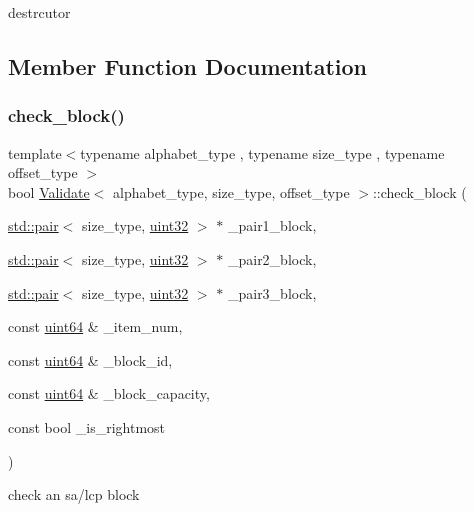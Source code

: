 destrcutor 



\subsection{Member Function Documentation}
\mbox{\label{class_validate_a3d560deb2bd3e2984f6f3b8b8b766904}} 
\subsubsection{\texorpdfstring{check\+\_\+block()}{check\_block()}}
{\footnotesize\ttfamily template$<$typename alphabet\+\_\+type , typename size\+\_\+type , typename offset\+\_\+type $>$ \\
bool \hyperlink{class_validate}{Validate}$<$ alphabet\+\_\+type, size\+\_\+type, offset\+\_\+type $>$\+::check\+\_\+block (\begin{DoxyParamCaption}\item[{\hyperlink{tuples_8h_a80f1b898df1006722612d5ecf89cd4d7}{std\+::pair}$<$ size\+\_\+type, \hyperlink{types_8h_a8f95e75e58492e87412191fabadd8ca8}{uint32} $>$ $\ast$}]{\+\_\+pair1\+\_\+block,  }\item[{\hyperlink{tuples_8h_a80f1b898df1006722612d5ecf89cd4d7}{std\+::pair}$<$ size\+\_\+type, \hyperlink{types_8h_a8f95e75e58492e87412191fabadd8ca8}{uint32} $>$ $\ast$}]{\+\_\+pair2\+\_\+block,  }\item[{\hyperlink{tuples_8h_a80f1b898df1006722612d5ecf89cd4d7}{std\+::pair}$<$ size\+\_\+type, \hyperlink{types_8h_a8f95e75e58492e87412191fabadd8ca8}{uint32} $>$ $\ast$}]{\+\_\+pair3\+\_\+block,  }\item[{const \hyperlink{types_8h_a60e8696a4678cd348e991a1f172e53f7}{uint64} \&}]{\+\_\+item\+\_\+num,  }\item[{const \hyperlink{types_8h_a60e8696a4678cd348e991a1f172e53f7}{uint64} \&}]{\+\_\+block\+\_\+id,  }\item[{const \hyperlink{types_8h_a60e8696a4678cd348e991a1f172e53f7}{uint64} \&}]{\+\_\+block\+\_\+capacity,  }\item[{const bool}]{\+\_\+is\+\_\+rightmost }\end{DoxyParamCaption})\hspace{0.3cm}{\ttfamily [inline]}}



check an sa/lcp block 

